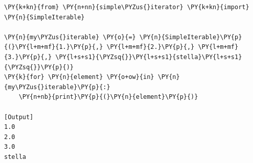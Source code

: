 \begin{Verbatim}[label=\makebox{\url{https://github.com/lucabaldini/cmepda/tree/master/slides/latex/snippets/test\_simple\_iterator.py}},commandchars=\\\{\}]
\PY{k+kn}{from} \PY{n+nn}{simple\PYZus{}iterator} \PY{k+kn}{import} \PY{n}{SimpleIterable}
   
\PY{n}{my\PYZus{}iterable} \PY{o}{=} \PY{n}{SimpleIterable}\PY{p}{(}\PY{l+m+mf}{1.}\PY{p}{,} \PY{l+m+mf}{2.}\PY{p}{,} \PY{l+m+mf}{3.}\PY{p}{,} \PY{l+s+s1}{\PYZsq{}}\PY{l+s+s1}{stella}\PY{l+s+s1}{\PYZsq{}}\PY{p}{)}
\PY{k}{for} \PY{n}{element} \PY{o+ow}{in} \PY{n}{my\PYZus{}iterable}\PY{p}{:}
    \PY{n+nb}{print}\PY{p}{(}\PY{n}{element}\PY{p}{)}

[Output]
1.0
2.0
3.0
stella
\end{Verbatim}